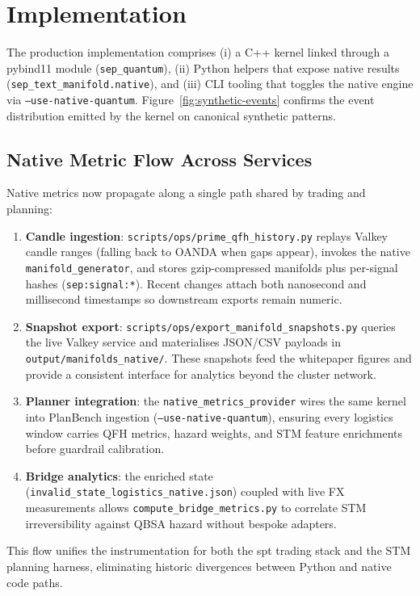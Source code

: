 \documentclass[11pt]{article}
\begin{document}
\section{Implementation}
The production implementation comprises (i) a C++ kernel linked through a pybind11 module (\texttt{sep\_quantum}), (ii) Python helpers that expose native results (\texttt{sep\_text\_manifold.native}), and (iii) CLI tooling that toggles the native engine via \texttt{--use-native-quantum}. Figure~\ref{fig:synthetic-events} confirms the event distribution emitted by the kernel on canonical synthetic patterns.

\subsection{Native Metric Flow Across Services}
Native metrics now propagate along a single path shared by trading and planning:
\begin{enumerate}
  \item \textbf{Candle ingestion}: \texttt{scripts/ops/prime\_qfh\_history.py} replays Valkey candle ranges (falling back to OANDA when gaps appear), invokes the native \texttt{manifold\_generator}, and stores gzip-compressed manifolds plus per-signal hashes (\texttt{sep:signal:*}). Recent changes attach both nanosecond and millisecond timestamps so downstream exports remain numeric.
  \item \textbf{Snapshot export}: \texttt{scripts/ops/export\_manifold\_snapshots.py} queries the live Valkey service and materialises JSON/CSV payloads in \texttt{output/manifolds\_native/}. These snapshots feed the whitepaper figures and provide a consistent interface for analytics beyond the cluster network.
  \item \textbf{Planner integration}: the \texttt{native\_metrics\_provider} wires the same kernel into PlanBench ingestion (\texttt{--use-native-quantum}), ensuring every logistics window carries QFH metrics, hazard weights, and STM feature enrichments before guardrail calibration.
  \item \textbf{Bridge analytics}: the enriched state (\texttt{invalid\_state\_logistics\_native.json}) coupled with live FX measurements allows \texttt{compute\_bridge\_metrics.py} to correlate STM irreversibility against QBSA hazard without bespoke adapters.
\end{enumerate}

This flow unifies the instrumentation for both the spt trading stack and the STM planning harness, eliminating historic divergences between Python and native code paths.
\end{document}
